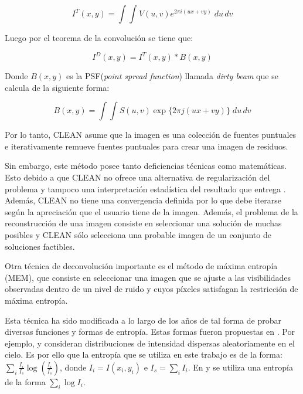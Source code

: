 \begin{equation}
I^{T}(x,y) = \int\int V(u,v)e^{2\pi i(ux+vy)}\;du\,dv
\label{eq:fullcoverage}
\end{equation} 

Luego por el teorema de la convolución se tiene que:

\begin{equation}
I^{D}(x,y) = I^{T}(x,y) \ast B(x,y)
\end{equation}

Donde $B(x,y)$ es la PSF(\textit{point spread function}) llamada \textit{dirty beam} que se calcula de la siguiente forma:

\begin{equation}
B(x,y) = \int\int S(u,v) \exp\{2\pi j(ux+vy)\} \;du\,dv
\end{equation}

Por lo tanto, CLEAN asume que la imagen es una colección de fuentes puntuales e iterativamente remueve fuentes puntuales para crear una imagen de residuos.

Sin embargo, este método posee tanto deficiencias técnicas como matemáticas. Esto debido a que CLEAN no ofrece una alternativa de regularización del problema y tampoco una interpretación estadística del resultado que entrega \cite{libroAstro2}. Además, CLEAN no tiene una convergencia definida por lo que debe iterarse según la apreciación que el usuario tiene de la imagen. Además, el problema de la reconstrucción de una imagen consiste en seleccionar una solución de muchas posibles y CLEAN sólo selecciona una probable imagen de un conjunto de soluciones factibles.
 
Otra técnica de deconvolución importante es el método de máxima entropía (MEM), que consiste en seleccionar una imagen que se ajuste a las visibilidades observadas dentro de un nivel de ruido y cuyos píxeles satisfagan la restricción de máxima entropía.

Esta técnica ha sido modificada a lo largo de los años de tal forma de probar diversas funciones y formas de entropía. Estas formas fueron propuestas en \cite{FRIEDEN:72, themaxen, memsan, daddario}. Por ejemplo, \cite{FRIEDEN:72} y \cite{themaxen} consideran distribuciones de intensidad dispersas aleatoriamente en el cielo. Es por ello que la entropía que se utiliza en este trabajo es de la forma: $\sum_{i}\frac{I_{i}}{I_{s}}\log(\frac{I_{i}}{I_{s}})$, donde $I_{i}=I(x_{i}, y_{i})$ e $I_{s}=\sum_{i}I_{i}$. En \cite{memsan} y \cite{daddario} se utiliza una entropía de la forma $\sum_{i}\log I_{i}$.

